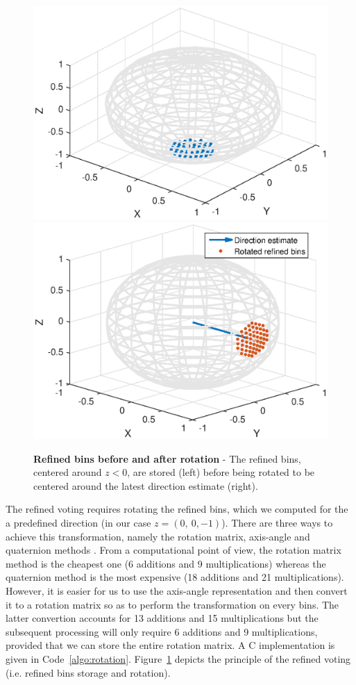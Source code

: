 \begin{figure}[h]
\includegraphics[width = 0.5\linewidth]{images/matlab/refinedBinsNoRot}
\includegraphics[width = 0.5\linewidth]{images/matlab/refinedBinsRot}
\caption{\textbf{Refined bins before and after rotation} - The refined bins, centered around $z<0$, are stored (left) before being rotated to be centered around the latest direction estimate (right).\label{fig:refinedBins}}
\end{figure}

The refined voting requires rotating the refined bins, which we computed for the a predefined direction (in our case $z = (0,~ 0,-1)$). There are three ways to achieve this transformation, namely the rotation matrix, axis-angle and quaternion methods \cite{rotation}. From a computational point of view, the rotation matrix method is the cheapest one (6 additions and 9 multiplications) whereas the quaternion method is the most expensive (18 additions and 21 multiplications). However, it is easier for us to use the axis-angle representation and then convert it to a rotation matrix so as to perform the transformation on every bins. The latter convertion accounts for 13 additions and 15 multiplications but the subsequent processing will only require 6 additions and 9 multiplications, provided that we can store the entire rotation matrix. A C implementation is given in Code~\ref{algo:rotation}. Figure~\ref{fig:refinedBins} depicts the principle of the refined voting (i.e. refined bins storage and rotation).

